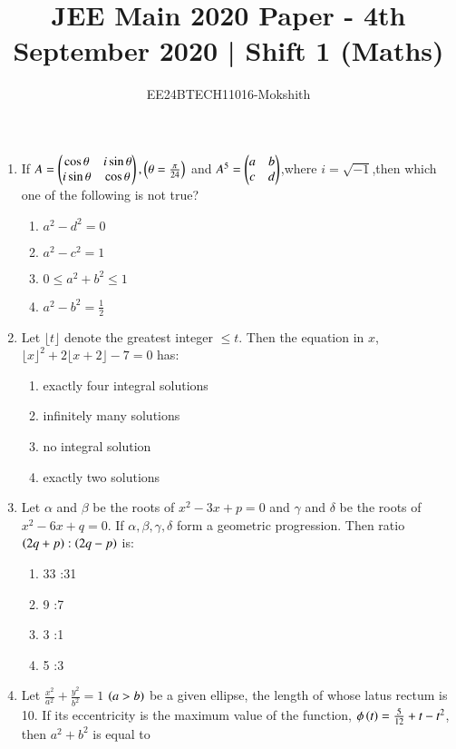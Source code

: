 \documentclass[journal]{IEEEtran}
\begin{document}

\title{JEE Main 2020 Paper - 4th September 2020 | Shift 1 (Maths)}
\author{EE24BTECH11016-Mokshith}
{\let\newpage\relax\maketitle}
\renewcommand{\thefigure}{\theenumi}
\renewcommand{\thetable}{\theenumi}
\setlength{\intextsep}{10pt} %
\renewcommand{\thetable}{\theenumi}

\begin{enumerate}
\item If $A=\begin{pmatrix}\cos\theta&i\sin\theta\\i\sin\theta&\cos\theta\end{pmatrix},\left(\theta=\frac{\pi}{24}\right)$ and $A^5=\begin{pmatrix}a&b\\c&d\end{pmatrix}$,where $i=\sqrt{-1}$,then which one of the following is not true?
\begin{enumerate}
    \item $a^2-d^2=0$
    \item $a^2-c^2=1$
    \item $0\leq a^2+b^2\leq1$
    \item $a^2-b^2=\frac{1}{2}$
\end{enumerate}
\item Let $\lfloor t\rfloor$ denote the greatest integer $\leq t$. Then the equation in $x$,$\lfloor x\rfloor^2+2\lfloor x+2\rfloor-7=0$ has:
\begin{enumerate}
    \item exactly four integral solutions
    \item infinitely many solutions
    \item no integral solution
    \item exactly two solutions
    \end{enumerate}
\item Let $\alpha$ and $\beta$ be the roots of $x^2-3x+p=0$ and $\gamma$ and $\delta$ be the roots of $x^2-6x+q=0$. If $\alpha,\beta,\gamma,\delta$ form a geometric progression. Then ratio $\left(2q+p\right):\left(2q-p\right)$ is:
\begin{enumerate}
    \item 33 :31
    \item 9 :7
    \item 3 :1
    \item 5 :3
\end{enumerate}
\item Let $\frac{x^2}{a^2}+\frac{y^2}{b^2}=1$ $\left(a>b\right)$ be a given ellipse, the length of whose latus rectum is 10. If its eccentricity is the maximum value of the function, $\phi\left(t\right)=\frac{5}{12}+t-t^2$, then $a^2 + b^2$ is equal to

\end{enumerate}
\end{document}
